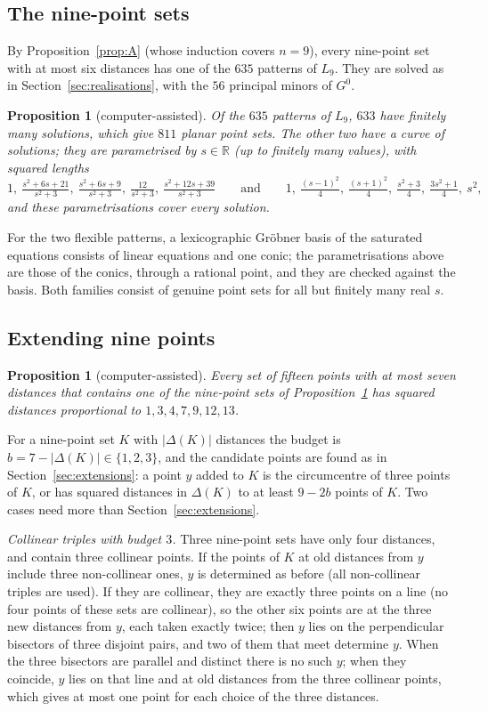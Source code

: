 \documentclass[11pt]{amsart}
\newtheorem{proposition}[theorem]{Proposition}
\theoremstyle{definition}
\theoremstyle{remark}
\newcommand{\R}{\mathbb{R}}
\begin{document}
\subsection{The nine-point sets}
By Proposition~\ref{prop:A} (whose induction covers $n=9$), every nine-point set with at most six distances has
one of the $635$ patterns of $L_9$. They are solved as in Section~\ref{sec:realisations}, with the $56$
principal minors of $G^0$.

\begin{proposition}[computer-assisted]\label{prop:nine}
Of the $635$ patterns of $L_9$, $633$ have finitely many solutions, which give $811$ planar point sets. The
other two have a curve of solutions; they are parametrised by $s\in\R$ (up to finitely many values), with
squared lengths
\[
  1,\ \tfrac{s^2+6s+21}{s^2+3},\ \tfrac{s^2+6s+9}{s^2+3},\ \tfrac{12}{s^2+3},\ \tfrac{s^2+12s+39}{s^2+3}
  \qquad\text{and}\qquad
  1,\ \tfrac{(s-1)^2}4,\ \tfrac{(s+1)^2}4,\ \tfrac{s^2+3}4,\ \tfrac{3s^2+1}4,\ s^2,
\]
and these parametrisations cover every solution.
\end{proposition}

For the two flexible patterns, a lexicographic Gröbner basis of the saturated equations consists of linear
equations and one conic; the parametrisations above are those of the conics, through a rational point,
and they are checked against the basis. Both families consist of genuine point sets for all but finitely many
real $s$.

\subsection{Extending nine points}
\begin{proposition}[computer-assisted]\label{prop:extend15}
Every set of fifteen points with at most seven distances that contains one of the nine-point sets of
Proposition~\ref{prop:nine} has squared distances proportional to $1,3,4,7,9,12,13$.
\end{proposition}

For a nine-point set $K$ with $|\Delta(K)|$ distances the budget is $b=7-|\Delta(K)|\in\{1,2,3\}$, and the
candidate points are found as in Section~\ref{sec:extensions}: a point $y$ added to $K$ is the circumcentre of
three points of $K$, or has squared distances in $\Delta(K)$ to at least $9-2b$ points of $K$. Two cases need more
than Section~\ref{sec:extensions}.

\emph{Collinear triples with budget $3$.} Three nine-point sets have only four distances, and contain three
collinear points. If the points of $K$ at old distances from $y$ include three non-collinear ones, $y$ is
determined as before (all non-collinear triples are used). If they are collinear, they are exactly three
points on a line (no four points of these sets are collinear), so the other six points are at the three new
distances from $y$, each taken exactly twice; then $y$ lies on the perpendicular bisectors of three disjoint
pairs, and two of them that meet determine $y$. When the three bisectors are parallel and distinct there is no
such $y$; when they coincide, $y$ lies on that line and at old distances from the three collinear points, which
gives at most one point for each choice of the three distances.
\end{document}
